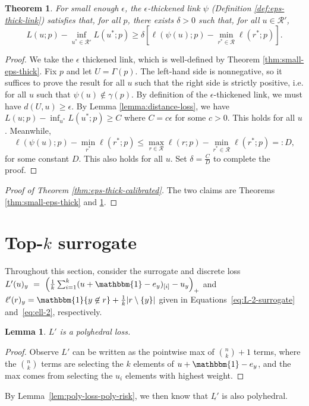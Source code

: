 \documentclass[12pt]{article}
\newcommand{\R}{\mathcal{R}}
\newcommand{\risk}[1]{\underline{#1}}
\newcommand{\ones}{\mathbbm{1}}
\newcommand{\Ind}[1]{\ones\{#1\}}
\newtheorem{theorem}{Theorem}
\newtheorem{lemma}{Lemma}
\begin{document}
\begin{theorem} \label{thm:app-eps-thick-sep}
  For small enough $\epsilon$, the $\epsilon$-thickened link $\psi$ (Definition \ref{def:eps-thick-link}) satisfies that, for all $p$, there exists $\delta > 0$ such that, for all $u \in \R'$,
    \[ L(u;p) - \inf_{u^* \in \R'} L(u^*;p) \geq \delta \left[ \ell(\psi(u);p) - \min_{r^* \in \R} \ell(r^*;p) \right] . \]
\end{theorem}
\begin{proof}
  We take the $\epsilon$ thickened link, which is well-defined by Theorem \ref{thm:small-eps-thick}.
  Fix $p$ and let $U = \Gamma(p)$.
  The left-hand side is nonnegative, so it suffices to prove the result for all $u$ such that the right side is strictly positive, i.e. for all $u$ such that $\psi(u) \not\in \gamma(p)$.
  By definition of the $\epsilon$-thickened link, we must have $d(U,u) \geq \epsilon$.
  By Lemma \ref{lemma:distance-loss}, we have $L(u;p) - \inf_{u^*} L(u^*;p) \geq C$ where $C = c\epsilon$ for some $c > 0$.
  This holds for all $u$.
  Meanwhile,
    \[ \ell(\psi(u);p) - \min_{r^*} \ell(r^*;p) \leq \max_{r \in \R} \ell(r;p) - \min_{r^* \in \R} \ell(r^*;p) =: D, \]
  for some constant $D$.
  This also holds for all $u$.
  Set $\delta = \frac{C}{D}$ to complete the proof.
\end{proof}

\begin{proof}[Proof of Theorem \ref{thm:eps-thick-calibrated}]
  The two claims are Theorems \ref{thm:small-eps-thick} and \ref{thm:app-eps-thick-sep}.
\end{proof}


\section{Top-$k$ surrogate}
Throughout this section, consider the surrogate and discrete loss $L'(u)_y~=~\left(\frac{1}{k} \sum_{i=1}^k (u + \ones - e_y)_{[i]} - u_y \right)_+$ and $\ell'(r)_y = \Ind{y \not\in r} + \frac{1}{k} |r \setminus \{y\}|$ given in Equations~\ref{eq:L-2-surrogate} and~\ref{eq:ell-2}, respectively.

\begin{lemma}\label{lem:top-k-polyhedral}
$L'$ is a polyhedral loss.
\end{lemma}
\begin{proof}
Observe $L'$ can be written as the pointwise max of $\binom{n}{k} +1$ terms, where the $\binom{n}{k}$ terms are selecting the $k$ elements of $u + \ones - e_y$, and the max comes from selecting the $u_i$ elements with highest weight.
\end{proof}
By Lemma~\ref{lem:poly-loss-poly-risk}, we then know that $\risk{L'}$ is also polyhedral.
\end{document}
